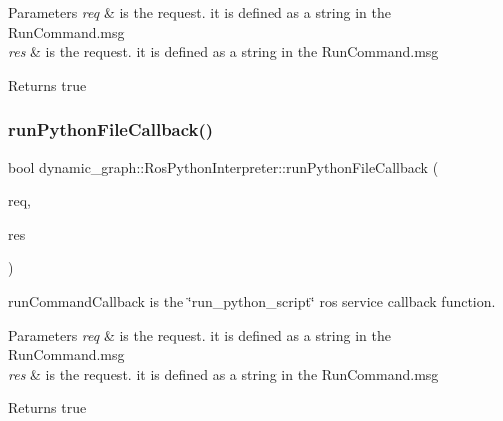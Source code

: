 \begin{DoxyParams}{Parameters}
{\em req} & is the request. it is defined as a string in the Run\+Command.\+msg \\
\hline
{\em res} & is the request. it is defined as a string in the Run\+Command.\+msg \\
\hline
\end{DoxyParams}
\begin{DoxyReturn}{Returns}
true 
\end{DoxyReturn}
\mbox{\label{classdynamic__graph_1_1RosPythonInterpreter_a519321128872afdcec622a4892c63196}} 
\subsubsection{\texorpdfstring{run\+Python\+File\+Callback()}{runPythonFileCallback()}}
{\footnotesize\ttfamily bool dynamic\+\_\+graph\+::\+Ros\+Python\+Interpreter\+::run\+Python\+File\+Callback (\begin{DoxyParamCaption}\item[{dynamic\+\_\+graph\+\_\+manager\+::\+Run\+Python\+File\+::\+Request \&}]{req,  }\item[{dynamic\+\_\+graph\+\_\+manager\+::\+Run\+Python\+File\+::\+Response \&}]{res }\end{DoxyParamCaption})\hspace{0.3cm}{\ttfamily [protected]}}



run\+Command\+Callback is the \char`\"{}run\+\_\+python\+\_\+script\char`\"{} ros service callback function. 


\begin{DoxyParams}{Parameters}
{\em req} & is the request. it is defined as a string in the Run\+Command.\+msg \\
\hline
{\em res} & is the request. it is defined as a string in the Run\+Command.\+msg \\
\hline
\end{DoxyParams}
\begin{DoxyReturn}{Returns}
true 
\end{DoxyReturn}


